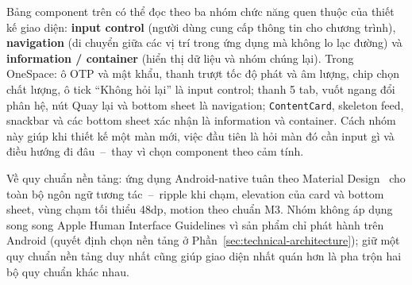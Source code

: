 Bảng component trên có thể đọc theo ba nhóm chức năng quen thuộc của thiết kế giao diện: \textbf{input control} (người dùng cung cấp thông tin cho chương trình), \textbf{navigation} (di chuyển giữa các vị trí trong ứng dụng mà không lo lạc đường) và \textbf{information / container} (hiển thị dữ liệu và nhóm chúng lại). Trong OneSpace: ô OTP và mật khẩu, thanh trượt tốc độ phát và âm lượng, chip chọn chất lượng, ô tick ``Không hỏi lại'' là input control; thanh 5 tab, vuốt ngang đổi phân hệ, nút Quay lại và bottom sheet là navigation; \texttt{ContentCard}, skeleton feed, snackbar và các bottom sheet xác nhận là information và container. Cách nhóm này giúp khi thiết kế một màn mới, việc đầu tiên là hỏi màn đó cần input gì và điều hướng đi đâu~--~thay vì chọn component theo cảm tính.

Về quy chuẩn nền tảng: ứng dụng Android-native tuân theo Material Design~\cite{material3} cho toàn bộ ngôn ngữ tương tác~--~ripple khi chạm, elevation của card và bottom sheet, vùng chạm tối thiểu 48dp, motion theo chuẩn M3. Nhóm không áp dụng song song Apple Human Interface Guidelines vì sản phẩm chỉ phát hành trên Android (quyết định chọn nền tảng ở Phần~\ref{sec:technical-architecture}); giữ một quy chuẩn nền tảng duy nhất cũng giúp giao diện nhất quán hơn là pha trộn hai bộ quy chuẩn khác nhau.
